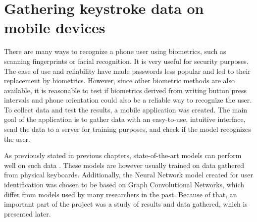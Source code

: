 
\chapter{Gathering keystroke data on mobile devices}

There are many ways to recognize a phone user using biometrics, such as scanning fingerprints or facial recognition. It is very useful for security purposes. The ease of use and reliability have made passwords less popular and led to their replacement by biometrics. However, since other biometric methods are also available, it is reasonable to test if biometrics derived from writing button press intervals and phone orientation could also be a reliable way to recognize the user. To collect data and test the results, a mobile application was created.
The main goal of the application is to gather data with an easy-to-use, intuitive interface, send the data to a server for training purposes, and check if the model recognizes the user. 

As previously stated in previous chapters, state-of-the-art models can perform well on such data \cite{Lu2020}. These models are however usually trained on data gathered from physical keyboards. Additionally, the Neural Network model created for user identification was chosen to be based on Graph Convolutional Networks, which differ from models used by many researchers in the past.
Because of that, an important part of the project was a study of results and data gathered, which is presented later.


